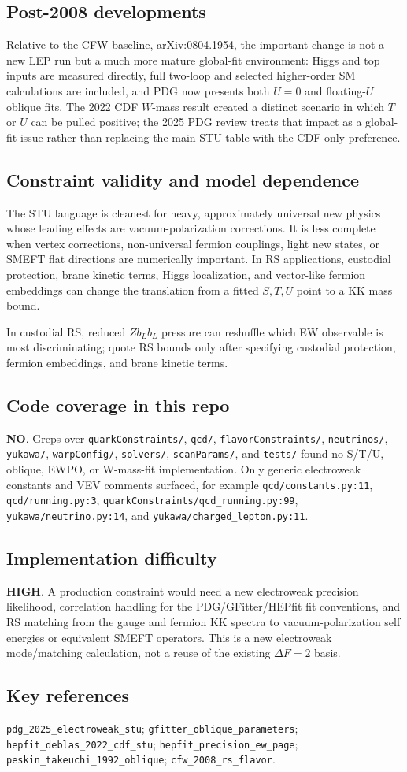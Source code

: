 \subsection*{Post-2008 developments}
Relative to the CFW baseline, arXiv:0804.1954, the important change is not a
new LEP run but a much more mature global-fit environment: Higgs and top inputs
are measured directly, full two-loop and selected higher-order SM calculations
are included, and PDG now presents both \(U=0\) and floating-\(U\) oblique fits.
The 2022 CDF \(W\)-mass result created a distinct scenario in which \(T\) or
\(U\) can be pulled positive; the 2025 PDG review treats that impact as a
global-fit issue rather than replacing the main STU table with the CDF-only
preference.

\subsection*{Constraint validity and model dependence}
The STU language is cleanest for heavy, approximately universal new physics
whose leading effects are vacuum-polarization corrections.  It is less complete
when vertex corrections, non-universal fermion couplings, light new states, or
SMEFT flat directions are numerically important.  In RS applications, custodial
protection, brane kinetic terms, Higgs localization, and vector-like fermion
embeddings can change the translation from a fitted \(S,T,U\) point to a KK
mass bound.

In custodial RS, reduced \(Z b_L b_L\) pressure can reshuffle which EW
observable is most discriminating; quote RS bounds only after specifying
custodial protection, fermion embeddings, and brane kinetic terms.

\subsection*{Code coverage in this repo}
\textbf{NO}.  Greps over \texttt{quarkConstraints/}, \texttt{qcd/},
\texttt{flavorConstraints/}, \texttt{neutrinos/}, \texttt{yukawa/},
\texttt{warpConfig/}, \texttt{solvers/}, \texttt{scanParams/}, and
\texttt{tests/} found no S/T/U, oblique, EWPO, or W-mass-fit implementation.
Only generic electroweak constants and VEV comments surfaced, for example
\texttt{qcd/constants.py:11}, \texttt{qcd/running.py:3},
\texttt{quarkConstraints/qcd\_running.py:99}, \texttt{yukawa/neutrino.py:14},
and \texttt{yukawa/charged\_lepton.py:11}.

\subsection*{Implementation difficulty}
\textbf{HIGH}.  A production constraint would need a new electroweak precision
likelihood, correlation handling for the PDG/GFitter/HEPfit fit conventions,
and RS matching from the gauge and fermion KK spectra to vacuum-polarization
self energies or equivalent SMEFT operators.  This is a new electroweak
mode/matching calculation, not a reuse of the existing \(\Delta F=2\) basis.

\subsection*{Key references}
\texttt{pdg\_2025\_electroweak\_stu};
\texttt{gfitter\_oblique\_parameters};
\texttt{hepfit\_deblas\_2022\_cdf\_stu};
\texttt{hepfit\_precision\_ew\_page};
\texttt{peskin\_takeuchi\_1992\_oblique};
\texttt{cfw\_2008\_rs\_flavor}.

